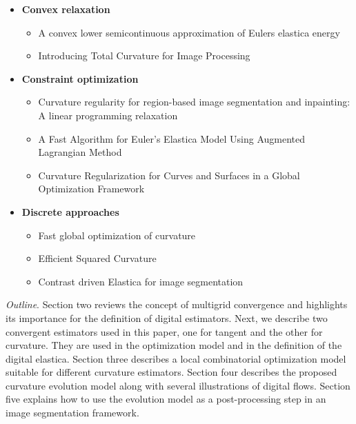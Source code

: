 \documentclass[runningheads]{llncs}
\begin{document}
\begin{itemize}
\item{\textbf{Convex relaxation}}
  \begin{itemize}
  \item{A convex lower semicontinuous approximation of Eulers elastica energy \cite{bredies15convex}}
  \item{Introducing Total Curvature for Image Processing \cite{goldluecke11totalcurvature}}
  \end{itemize}	
  
\item{\textbf{Constraint optimization}}
  \begin{itemize}
  \item{Curvature regularity for region-based image segmentation and inpainting: A linear programming relaxation \cite{schoenemann09linear} }	
  \item{A Fast Algorithm for Euler's Elastica Model Using Augmented Lagrangian Method \cite{tai11elastica} }		
  \item{Curvature Regularization for Curves and Surfaces in a Global Optimization Framework \cite{strandmark11globalframework} }
  \end{itemize}
  
\item{\textbf{Discrete approaches}}
  \begin{itemize}
  \item{Fast global optimization of curvature \cite{zehiry10fast}	}
  \item{Efficient Squared Curvature \cite{nieuwenhuis14efficient} 	}
  \item{Contrast driven {E}lastica for image segmentation \cite{el2016contrast} }	
  \end{itemize}
  
	
\end{itemize}


\textit{Outline}. Section two reviews the concept of multigrid
convergence and highlights its importance for the definition of
digital estimators. Next, we describe two convergent estimators used
in this paper, one for tangent and the other for curvature. They are
used in the optimization model and in the definition of the digital
elastica. Section three describes a local combinatorial optimization model
suitable for different curvature estimators. Section four describes the proposed 
curvature evolution model along with several illustrations of digital flows. Section five
explains how to use the evolution model as a post-processing step in
an image segmentation framework. 
\end{document}
